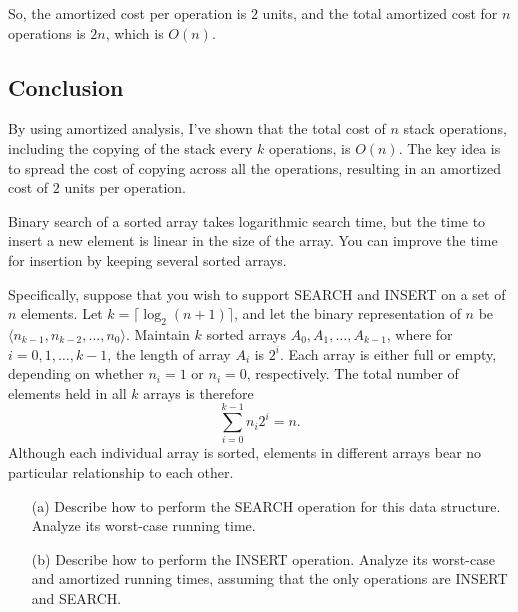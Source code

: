 \documentclass[10pt,letter,notitlepage]{article}
\newcounter{exercise}
\begin{document}
\begin{Answer}
So, the amortized cost per operation is $2$ units, and the total amortized cost for $n$ operations is $2n$, which is $O(n)$.

\subsection*{Conclusion}
By using amortized analysis, I've shown that the total cost of $n$ stack operations, including the copying of the stack every $k$ operations, is $O(n)$. The key idea is to spread the cost of copying across all the operations, resulting in an amortized cost of $2$ units per operation.


\end{Answer}

\begin{exercise}[(20 marks)]
Binary search of a sorted array takes logarithmic search time, but the time to insert a new element is linear in the size of the array. You can improve the time for insertion by keeping several sorted arrays.

Specifically, suppose that you wish to support SEARCH and INSERT on a set of $n$ elements. Let $k = \lceil \log_2(n+ 1) \rceil$, and let the binary representation of $n$ be $\langle n_{k-1}, n_{k-2}, \dots, n_0 \rangle$. Maintain $k$ sorted arrays $A_0, A_1, \dots, A_{k-1}$, where for $i = 0, 1, \dots, k-1$, the length of array $A_i$ is $2^i$. Each array is either full or empty, depending on whether $n_i = 1$ or $n_i = 0$, respectively. The total number of elements held in all $k$ arrays is therefore 
\[
\sum_{i=0}^{k-1} n_i 2^i = n.
\]
Although each individual array is sorted, elements in different arrays bear no particular relationship to each other.

\begin{itemize}
  \item[(a)] Describe how to perform the SEARCH operation for this data structure. Analyze its worst-case running time.
  \item[(b)] Describe how to perform the INSERT operation. Analyze its worst-case and amortized running times, assuming that the only operations are INSERT and SEARCH.
\end{itemize}

\end{exercise}
\end{document}
